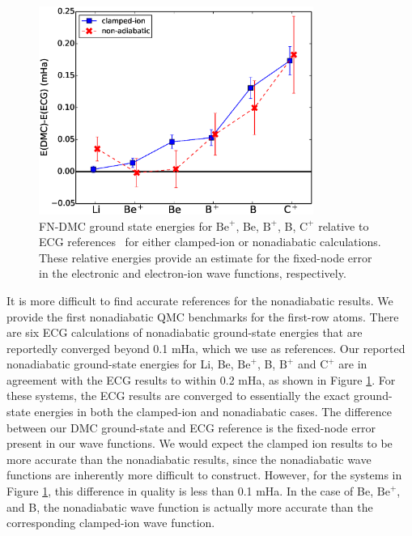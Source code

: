 \begin{figure}[h]
\centering
\includegraphics[width=0.8\textwidth]{atom-ECG}
\caption{FN-DMC ground state energies for $\text{Be}^+$, Be, $\text{B}^+$, B, $\text{C}^+$ relative to ECG references~\cite{Stanke_Be,Puchalski_Be+,Bubin_BeH_noBO,Bubin_B,Bubin_B+,Bubin_C+} for either clamped-ion or nonadiabatic calculations. These relative energies provide an estimate for the fixed-node error in the electronic and electron-ion wave functions, respectively.\label{fig:atom-ECG}}
\end{figure}

It is more difficult to find accurate references for the nonadiabatic results. We provide the first nonadiabatic QMC benchmarks for the first-row atoms. There are six ECG calculations of nonadiabatic ground-state energies that are reportedly converged beyond 0.1 mHa, which we use as references. Our reported nonadiabatic ground-state energies for Li, Be, $\text{Be}^+$, B, $\text{B}^+$ and $\text{C}^+$ are in agreement with the ECG results to within 0.2 mHa, as shown in Figure \ref{fig:atom-ECG}. For these systems, the ECG results are converged to essentially the exact ground-state energies in both the clamped-ion and nonadiabatic cases. The difference between our DMC ground-state and ECG reference is the fixed-node error present in our wave functions. We would expect the clamped ion results to be more accurate than the nonadiabatic results, since the nonadiabatic wave functions are inherently more difficult to construct.  However, for the systems in Figure \ref{fig:atom-ECG}, this difference in quality is less than 0.1 mHa. In the case of Be, $\text{Be}^+$, and B,  the nonadiabatic wave function is actually more accurate than the corresponding clamped-ion wave function.

